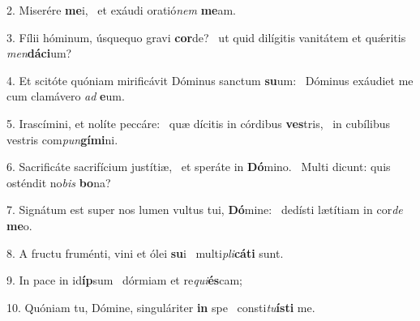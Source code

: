 2. Miserére \textbf{me}i, \ast\  et exáudi oratió\textit{nem} \textbf{me}am.\

3. Fílii hóminum, úsquequo gravi \textbf{cor}de? \ast\  ut quid dilígitis vanitátem et quǽritis \textit{men}\textbf{dá}\textbf{ci}um?\

4. Et scitóte quóniam mirificávit Dóminus sanctum \textbf{su}um: \ast\  Dóminus exáudiet me cum clamávero \textit{ad} \textbf{e}um.\

5. Irascímini, et nolíte peccáre: \dag\  quæ dícitis in córdibus \textbf{ves}tris, \ast\  in cubílibus vestris com\textit{pun}\textbf{gí}\textbf{mi}ni.\

6. Sacrificáte sacrifícium justítiæ, \dag\  et speráte in \textbf{Dó}mino. \ast\  Multi dicunt: quis osténdit no\textit{bis} \textbf{bo}na?\

7. Signátum est super nos lumen vultus tui, \textbf{Dó}mine: \ast\  dedísti lætítiam in cor\textit{de} \textbf{me}o.\

8. A fructu fruménti, vini et ólei \textbf{su}i \ast\  multi\textit{pli}\textbf{cá}\textbf{ti} sunt.\

9. In pace in id\textbf{íp}sum \ast\  dórmiam et re\textit{qui}\textbf{és}cam;\

10. Quóniam tu, Dómine, singuláriter \textbf{in} spe \ast\  consti\textit{tu}\textbf{ís}\textbf{ti} me.\

